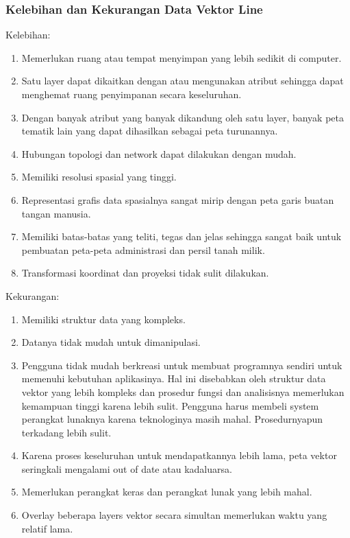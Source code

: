  \subsubsection{Kelebihan dan Kekurangan Data Vektor Line}
 Kelebihan:
 \begin{enumerate}
    \item Memerlukan ruang atau tempat menyimpan yang lebih sedikit di computer.
    \item Satu layer dapat dikaitkan dengan atau mengunakan atribut sehingga dapat menghemat ruang penyimpanan secara keseluruhan.
    \item Dengan banyak atribut yang banyak dikandung oleh satu layer, 
             banyak peta tematik lain yang dapat dihasilkan sebagai peta turunannya.
    \item Hubungan topologi dan network dapat dilakukan dengan mudah.
    \item Memiliki resolusi spasial yang tinggi.
    \item Representasi grafis data spasialnya sangat mirip dengan peta garis buatan tangan manusia.
    \item Memiliki batas-batas yang teliti, tegas dan jelas sehingga sangat baik untuk 
    pembuatan peta-peta administrasi dan persil tanah milik.
    \item Transformasi koordinat dan proyeksi tidak sulit dilakukan. 
 \end{enumerate}
 Kekurangan:
 \begin{enumerate}
    \item Memiliki struktur data yang kompleks.
    \item Datanya tidak mudah untuk dimanipulasi.
    \item Pengguna tidak mudah berkreasi untuk membuat programnya sendiri untuk memenuhi kebutuhan aplikasinya. 
             Hal ini disebabkan oleh struktur data vektor yang lebih kompleks dan prosedur fungsi dan analisisnya 
             memerlukan kemampuan tinggi karena lebih sulit. 
            Pengguna harus membeli system perangkat lunaknya karena teknologinya masih mahal. Prosedurnyapun terkadang lebih sulit.
    \item Karena proses keseluruhan untuk mendapatkannya lebih lama, peta vektor seringkali mengalami out of date atau kadaluarsa.
    \item Memerlukan perangkat keras dan perangkat lunak yang lebih mahal.
    \item Overlay beberapa layers vektor secara simultan memerlukan waktu yang relatif lama.
 \end{enumerate}
 
